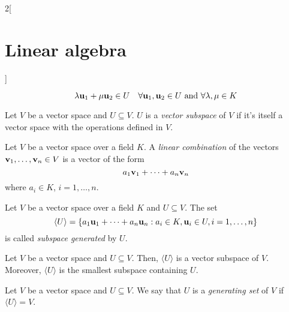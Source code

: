 \documentclass[../../../main.tex]{subfiles}
\begin{document}
\begin{multicols}{2}[\section{Linear algebra}]
\begin{definition}
    $$\lambda \boldsymbol{\mathrm{u}}_1+\mu \boldsymbol{\mathrm{u}}_2\in U\quad\forall \boldsymbol{\mathrm{u}}_1,\boldsymbol{\mathrm{u}}_2\in U\text{ and }\forall\lambda,\mu\in K$$
  \end{definition}
  \begin{definition}
    Let $V$ be a vector space and $U\subseteq V$. $U$ is a \emph{vector subspace} of $V$ if it's itself a vector space with the operations defined in $V$.
  \end{definition}
  \begin{definition}
    Let $V$ be a vector space over a field $K$. A \emph{linear combination} of the vectors $\boldsymbol{\mathrm{v}}_1,\ldots,\boldsymbol{\mathrm{v}}_n\in V$ is a vector of the form $$a_1\boldsymbol{\mathrm{v}}_1+\cdots+a_n\boldsymbol{\mathrm{v}}_n$$ where $a_i\in K$, $i=1,\ldots,n$.
  \end{definition}
  \begin{definition}
    Let $V$ be a vector space over a field $K$ and $U\subseteq V$. The set $$\langle U\rangle=\{a_1\boldsymbol{\mathrm{u}}_1+\cdots+a_n\boldsymbol{\mathrm{u}}_n:a_i\in K,\boldsymbol{\mathrm{u}}_i\in U,i=1,\ldots,n\}$$ is called \emph{subspace generated} by $U$.
  \end{definition}
  \begin{lemma}
    Let $V$ be a vector space and $U\subseteq V$. Then, $\langle U\rangle$ is a vector subspace of $V$. Moreover, $\langle U\rangle$ is the smallest subspace containing $U$.
  \end{lemma}
  \begin{definition}
    Let $V$ be a vector space and $U\subseteq V$. We say that $U$ is a \emph{generating set} of $V$ if $\langle U\rangle=V$.
  \end{definition}

\end{multicols}
\end{document}
